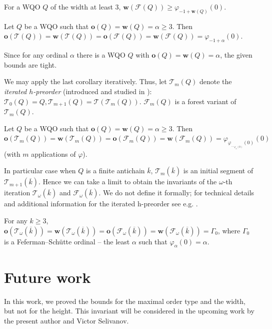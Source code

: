 \documentclass[runningheads]{llncs}
\let \geq \geqslant
\let \phi \varphi
\def \T {\mathcal{T}}
\def \F {\mathcal{F}}
\def \o {\textbf{o}}
\def \w {\textbf{w}}
\begin{document}
\begin{corollary}
    For a WQO $Q$ of the width at least 3, $\w(\F(Q)) \geq \phi_{-1+\w(Q)}(0)$.
\end{corollary}

\begin{corollary}
    Let $Q$ be a WQO such that $\o(Q) = \w(Q) = \alpha \geq 3$. Then $\o(\T(Q)) = \w(\T(Q)) = \o(\F(Q)) = \w(\F(Q)) = \phi_{-1+\alpha}(0)$.
\end{corollary}

Since for any ordinal $\alpha$ there is a WQO $Q$ with $\o(Q) = \w(Q) = \alpha$, the given bounds are tight.

We may apply the last corollary iteratively. Thus, let $\T_m(Q)$ denote the \textit{iterated $h$-preorder} (introduced and studied in \cite{Selivanov2011}): $\T_0(Q) = Q, \T_{m+1}(Q) = \T(\T_m(Q))$. $\F_m(Q)$ is a forest variant of $\T_m(Q)$.

\begin{corollary}
    Let $Q$ be a WQO such that $\o(Q) = \w(Q) = \alpha \geq 3$. Then $\o(\T_m(Q)) = \w(\T_m(Q)) = \o(\F_m(Q)) = \w(\F_m(Q)) = \phi_{\phi_{\dots_{\phi_\alpha(0)}}(0)}(0)$ (with $m$ applications of $\phi$).
\end{corollary}

In particular case when $Q$ is a finite antichain $\overline{k}$, $\T_m\left(\overline{k}\right)$ is an initial segment of $\T_{m+1}\left(\overline{k}\right)$. Hence we can take a limit to obtain the invariants of the $\omega$-th iteration $\T_\omega\left(\overline{k}\right)$ and $\F_\omega\left(\overline{k}\right)$. We do not define it formally; for technical details and additional information for the iterated h-preorder see e.g. \cite{Selivanov2011,Selivanov2022,Alaev2025}.

\begin{corollary}
    For any $k \geq 3$, $\o(\T_\omega\left(\overline{k}\right)) = \w(\T_\omega\left(\overline{k}\right)) = \o(\F_\omega\left(\overline{k}\right)) = \w(\F_\omega\left(\overline{k}\right)) = \Gamma_0$, where $\Gamma_0$ is a Feferman–Schütte ordinal -- the least $\alpha$ such that $\phi_\alpha(0) = \alpha$.
\end{corollary}

\section{Future work}

In this work, we proved the bounds for the maximal order type and the width, but not for the height. This invariant will be considered in the upcoming work by the present author and Victor Selivanov.
\end{document}
